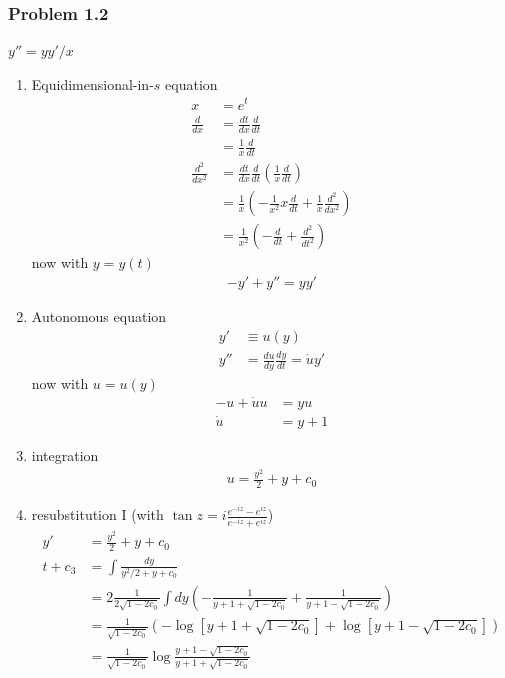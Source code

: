 \documentclass[10pt,a4paper]{article}
\theoremstyle{definition}
\begin{document}
\subsubsection{Problem 1.2}
$y''=yy'/x$
\begin{enumerate}
    \item Equidimensional-in-$s$ equation
    \begin{align}
        x&=e^t\\
        \frac{d}{dx}&=\frac{dt}{dx}\frac{d}{dt}\\
        &=\frac{1}{x}\frac{d}{dt}\\
        \frac{d^2}{dx^2}&=\frac{dt}{dx}\frac{d}{dt}\left(\frac{1}{x}\frac{d}{dt}\right)\\
        &=\frac{1}{x}\left(-\frac{1}{x^2}x\frac{d}{dt}+\frac{1}{x}\frac{d^2}{dx^2}\right)\\
        &=\frac{1}{x^2}\left(-\frac{d}{dt}+\frac{d^2}{dt^2}\right)
    \end{align}
    now with $y=y(t)$
    \begin{align}
        -y'+y''=yy'
    \end{align}
    \item Autonomous equation
    \begin{align}
        y'&\equiv u(y)\\
        y''&=\frac{du}{dy}\frac{dy}{dt}=\dot u y'
    \end{align}
    now with $u=u(y)$
    \begin{align}
        -u+\dot u u&=y u\\
        \dot u&=y+1
    \end{align}
    \item integration
    \begin{align}
        u=\frac{y^2}{2}+y+c_0
    \end{align}
    \item resubstitution I (with $\tan z = i\frac{e^{-iz}-e^{iz}}{e^{-iz}+e^{iz}}$)
    \begin{align}
        y'&=\frac{y^2}{2}+y+c_0\\
        t+c_3&=\int\frac{dy}{y^2/2+y+c_0}\\
        &=2\frac{1}{2\sqrt{1-2c_0}}\int dy\left(-\frac{1}{y+1+\sqrt{1-2c_0}}+\frac{1}{y+1-\sqrt{1-2c_0}}\right)\\
        &=\frac{1}{\sqrt{1-2c_0}}\left(-\log\left[y+1+\sqrt{1-2c_0}\right]+\log\left[y+1-\sqrt{1-2c_0}\right]\right)\\
        &=\frac{1}{\sqrt{1-2c_0}}\log\frac{y+1-\sqrt{1-2c_0}}{y+1+\sqrt{1-2c_0}}\\

\end{align}
\end{enumerate}
\end{document}
